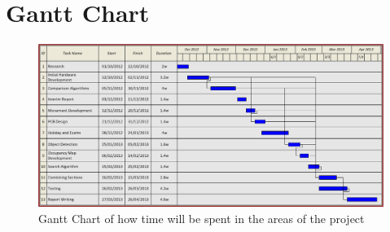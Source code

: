 \chapter{Gantt Chart} \label{Chapter:AppendixD:Gannt}

\begin{figure}
\centering
\includegraphics[angle = 90, width=\textwidth,height=\textheight-7cm,keepaspectratio]{Figures/Gantt.png} 
\caption{Gantt Chart of how time will be spent in the areas of the project}
\label{fig:Gantt}
\end{figure}